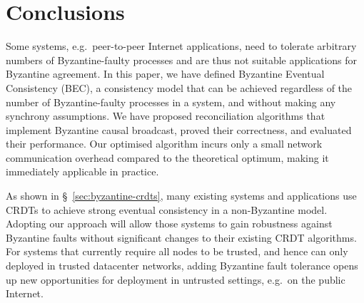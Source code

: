 \documentclass[a4paper,anonymous,USenglish]{lipics-v2019}
\begin{document}





\section{Conclusions}

Some systems, e.g.\ peer-to-peer Internet applications, need to tolerate arbitrary numbers of Byzantine-faulty processes and are thus not suitable applications for Byzantine agreement.
In this paper, we have defined Byzantine Eventual Consistency (BEC), a consistency model that can be achieved regardless of the number of Byzantine-faulty processes in a system, and without making any synchrony assumptions.
We have proposed reconciliation algorithms that implement Byzantine causal broadcast, proved their correctness, and evaluated their performance.
Our optimised algorithm incurs only a small network communication overhead compared to the theoretical optimum, making it immediately applicable in practice.

As shown in \S~\ref{sec:byzantine-crdts}, many existing systems and applications use CRDTs to achieve strong eventual consistency in a non-Byzantine model.
Adopting our approach will allow those systems to gain robustness against Byzantine faults without significant changes to their existing CRDT algorithms.
For systems that currently require all nodes to be trusted, and hence can only deployed in trusted datacenter networks, adding Byzantine fault tolerance opens up new opportunities for deployment in untrusted settings, e.g.\ on the public Internet.
\end{document}
